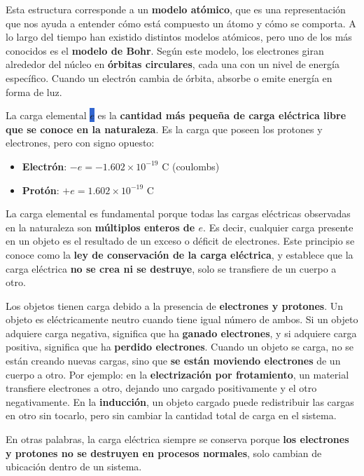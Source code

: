 Esta estructura corresponde a un \textbf{modelo atómico}, que es una representación que nos ayuda a entender cómo está compuesto un átomo y cómo se comporta. A lo largo del tiempo han existido distintos modelos atómicos, pero uno de los más conocidos es el \textbf{modelo de Bohr}. Según este modelo, los electrones giran alrededor del núcleo en \textbf{órbitas circulares}, cada una con un nivel de energía específico. Cuando un electrón cambia de órbita, absorbe o emite energía en forma de luz.

La carga elemental \colorbox{highlight}{\( e \)} es la \textbf{cantidad más pequeña de carga eléctrica libre que se conoce en la naturaleza}. Es la carga que poseen los protones y electrones, pero con signo opuesto:

\begin{itemize}
    \item \textbf{Electrón}: \( -e = -1.602 \times 10^{-19} \) C (coulombs)
    \item \textbf{Protón}: \( +e = 1.602 \times 10^{-19} \) C
\end{itemize}

La carga elemental es fundamental porque todas las cargas eléctricas observadas en la naturaleza son \textbf{múltiplos enteros de \( e \)}. Es decir, cualquier carga presente en un objeto es el resultado de un exceso o déficit de electrones. Este principio se conoce como la \textbf{ley de conservación de la carga eléctrica}, y establece que la carga eléctrica \textbf{no se crea ni se destruye}, solo se transfiere de un cuerpo a otro.  

Los objetos tienen carga debido a la presencia de \textbf{electrones y protones}. Un objeto es eléctricamente neutro cuando tiene igual número de ambos. Si un objeto adquiere carga negativa, significa que ha \textbf{ganado electrones}, y si adquiere carga positiva, significa que ha \textbf{perdido electrones}. Cuando un objeto se carga, no se están creando nuevas cargas, sino que \textbf{se están moviendo electrones} de un cuerpo a otro. Por ejemplo: en la \textbf{electrización por frotamiento}, un material transfiere electrones a otro, dejando uno cargado positivamente y el otro negativamente. En la \textbf{inducción}, un objeto cargado puede redistribuir las cargas en otro sin tocarlo, pero sin cambiar la cantidad total de carga en el sistema.

En otras palabras, la carga eléctrica siempre se conserva porque \textbf{los electrones y protones no se destruyen en procesos normales}, solo cambian de ubicación dentro de un sistema.

